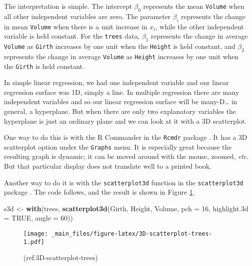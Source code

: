 \documentclass[]{book}
\newenvironment{Shaded}{\begin{snugshade}}{\end{snugshade}}
\newcommand{\KeywordTok}[1]{\textcolor[rgb]{0.13,0.29,0.53}{\textbf{{#1}}}}
\newcommand{\DataTypeTok}[1]{\textcolor[rgb]{0.13,0.29,0.53}{{#1}}}
\newcommand{\DecValTok}[1]{\textcolor[rgb]{0.00,0.00,0.81}{{#1}}}
\newcommand{\StringTok}[1]{\textcolor[rgb]{0.31,0.60,0.02}{{#1}}}
\newcommand{\OtherTok}[1]{\textcolor[rgb]{0.56,0.35,0.01}{{#1}}}
\newcommand{\NormalTok}[1]{{#1}}
\numberwithin{equation}{chapter}
\numberwithin{figure}{chapter}
\theoremstyle{plain}
\theoremstyle{definition}
\theoremstyle{remark}
\theoremstyle{definition}
\theoremstyle{definition}
\theoremstyle{remark}
\begin{document}
The interpretation is simple. The intercept \(\beta_{0}\) represents the
mean \texttt{Volume} when all other independent variables are zero. The
parameter \(\beta_{i}\) represents the change in mean \texttt{Volume}
when there is a unit increase in \(x_{i}\), while the other independent
variable is held constant. For the \texttt{trees} data, \(\beta_{1}\)
represents the change in average \texttt{Volume} as \texttt{Girth}
increases by one unit when the \texttt{Height} is held constant, and
\(\beta_{2}\) represents the change in average \texttt{Volume} as
\texttt{Height} increases by one unit when the \texttt{Girth} is held
constant.

In simple linear regression, we had one independent variable and our
linear regression surface was 1D, simply a line. In multiple regression
there are many independent variables and so our linear regression
surface will be many-D\ldots{} in general, a hyperplane. But when there
are only two explanatory variables the hyperplane is just an ordinary
plane and we can look at it with a 3D scatterplot.

One way to do this is with the R Commander in the \texttt{Rcmdr} package
\autocite{Rcmdr}. It has a 3D scatterplot option under the
\texttt{Graphs} menu. It is especially great because the resulting graph
is dynamic; it can be moved around with the mouse, zoomed, \emph{etc}.
But that particular display does not translate well to a printed book.

Another way to do it is with the \texttt{scatterplot3d} function in the
\texttt{scatterplot3d} package \autocite{scatterplot3d}. The code
follows, and the result is shown in Figure
\ref{fig:3D-scatterplot-trees}.

\begin{Shaded}
\begin{Highlighting}[]
\NormalTok{s3d <-}\StringTok{ }\KeywordTok{with}\NormalTok{(trees, }\KeywordTok{scatterplot3d}\NormalTok{(Girth, Height, Volume, }\DataTypeTok{pch =} \DecValTok{16}\NormalTok{, }
                                 \DataTypeTok{highlight.3d =} \OtherTok{TRUE}\NormalTok{, }\DataTypeTok{angle =} \DecValTok{60}\NormalTok{))}
\end{Highlighting}
\end{Shaded}

\begin{figure}[htbp]
\centering
\texttt{[image: \_main\_files/figure-latex/3D-scatterplot-trees-1.pdf]}
\caption{\label{fig:3D-scatterplot-trees}(ref:3D-scatterplot-trees)}
\end{figure}
\end{document}
